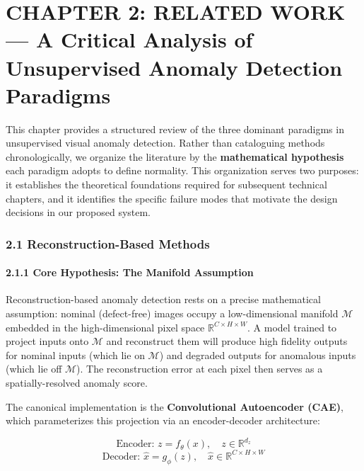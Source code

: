 \documentclass[12pt, a4paper, oneside]{report}
\begin{document}
\bigskip\noindent\hrulefill\bigskip

\chapter{CHAPTER 2: RELATED WORK --- A Critical Analysis of Unsupervised Anomaly Detection Paradigms}\label{chapter-2-related-work-a-critical-analysis-of-unsupervised-anomaly-detection-paradigms}

This chapter provides a structured review of the three dominant paradigms in unsupervised visual anomaly detection. Rather than cataloguing methods chronologically, we organize the literature by the \textbf{mathematical hypothesis} each paradigm adopts to define normality. This organization serves two purposes: it establishes the theoretical foundations required for subsequent technical chapters, and it identifies the specific failure modes that motivate the design decisions in our proposed system.

\bigskip\noindent\hrulefill\bigskip

\subsection{2.1 Reconstruction-Based Methods}\label{reconstruction-based-methods}

\subsubsection{2.1.1 Core Hypothesis: The Manifold Assumption}\label{core-hypothesis-the-manifold-assumption}

Reconstruction-based anomaly detection rests on a precise mathematical assumption: nominal (defect-free) images occupy a low-dimensional manifold \(\mathcal{M}\) embedded in the high-dimensional pixel space \(\mathbb{R}^{C \times H \times W}\). A model trained to project inputs onto \(\mathcal{M}\) and reconstruct them will produce high fidelity outputs for nominal inputs (which lie on \(\mathcal{M}\)) and degraded outputs for anomalous inputs (which lie off \(\mathcal{M}\)). The reconstruction error at each pixel then serves as a spatially-resolved anomaly score.

The canonical implementation is the \textbf{Convolutional Autoencoder (CAE)}, which parameterizes this projection via an encoder-decoder architecture:

\[\text{Encoder: } z = f_\theta(x), \quad z \in \mathbb{R}^{d_z}\] \[\text{Decoder: } \hat{x} = g_\phi(z), \quad \hat{x} \in \mathbb{R}^{C \times H \times W}\]
\end{document}
